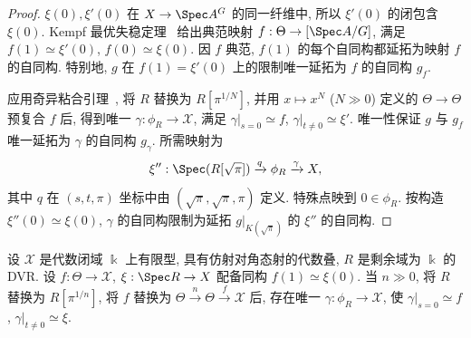 \begin{proof}
$\xi(0),\xi'(0)$ 在 $\mathcal X\to\Spec A^G$ 的同一纤维中, 所以 $\xi'(0)$ 的闭包含 $\xi(0)$. Kempf 最优失稳定理~ 给出典范映射 $f:\Theta\to[\Spec A/G]$, 满足 $f(1)\simeq\xi'(0)$, $f(0)\simeq\xi(0)$. 因 $f$ 典范, $f(1)$ 的每个自同构都延拓为映射 $f$ 的自同构. 特别地, $g$ 在 $f(1)=\xi'(0)$ 上的限制唯一延拓为 $f$ 的自同构 $g_f$.

应用奇异粘合引理~, 将 $R$ 替换为 $R[\pi^{1/N}]$, 并用 $x\mapsto x^N$ ($N\gg0$) 定义的 $\Theta\to\Theta$ 预复合 $f$ 后, 得到唯一 $\gamma:\phi_R\to\mathcal X$, 满足 $\gamma|_{s=0}\simeq f$, $\gamma|_{t\ne0}\simeq\xi'$. 唯一性保证 $g$ 与 $g_f$ 唯一延拓为 $\gamma$ 的自同构 $g_\gamma$. 所需映射为
\[\xi'':\Spec(R[\sqrt\pi])\xrightarrow{q}\phi_R\xrightarrow{\gamma}\mathcal X,\]
其中 $q$ 在 $(s,t,\pi)$ 坐标中由 $(\sqrt\pi,\sqrt\pi,\pi)$ 定义. 特殊点映到 $0\in\phi_R$. 按构造 $\xi''(0)\simeq\xi(0)$, $\gamma$ 的自同构限制为延拓 $g|_{K(\sqrt\pi)}$ 的 $\xi''$ 的自同构.
\end{proof}
\begin{lemma}[奇异粘合引理]\label{src:7.10.28}
设 $\mathcal X$ 是代数闭域 $\Bbbk$ 上有限型, 具有仿射对角态射的代数叠, $R$ 是剩余域为 $\Bbbk$ 的 DVR. 设 $f:\Theta\to\mathcal X$, $\xi:\Spec R\to\mathcal X$ 配备同构 $f(1)\simeq\xi(0)$. 当 $n\gg0$, 将 $R$ 替换为 $R[\pi^{1/n}]$, 将 $f$ 替换为 $\Theta\xrightarrow{n}\Theta\xrightarrow{f}\mathcal X$ 后, 存在唯一 $\gamma:\phi_R\to\mathcal X$, 使 $\gamma|_{s=0}\simeq f$, $\gamma|_{t\ne0}\simeq\xi$.
\end{lemma}
